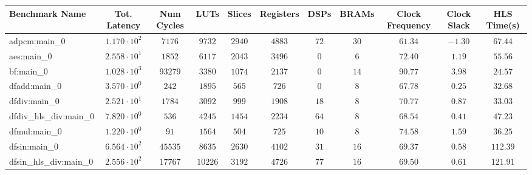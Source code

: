 \begin{tabular}{|l|c|c|c|c|c|c|c|c|c|c|}
\hline
Benchmark Name          & Tot. Latency           & Num Cycles & LUTs      & Slices    & Registers & DSPs    & BRAMs   & Clock Frequency & Clock Slack & HLS Time(s) \\
\hline
adpcm:main\_0           & $ 1.170 \cdot 10^{2} $ & $ 7176   $ & $ 9732  $ & $ 2940  $ & $ 4883  $ & $ 72  $ & $ 30  $ & $ 61.34       $ & $ -1.30   $ & $ 67.44   $ \\
aes:main\_0             & $ 2.558 \cdot 10^{1} $ & $ 1852   $ & $ 6117  $ & $ 2043  $ & $ 3496  $ & $ 0   $ & $ 6   $ & $ 72.40       $ & $ 1.19    $ & $ 55.56   $ \\
bf:main\_0              & $ 1.028 \cdot 10^{3} $ & $ 93279  $ & $ 3380  $ & $ 1074  $ & $ 2137  $ & $ 0   $ & $ 14  $ & $ 90.77       $ & $ 3.98    $ & $ 24.57   $ \\
dfadd:main\_0           & $ 3.570 \cdot 10^{0} $ & $ 242    $ & $ 1895  $ & $ 565   $ & $ 726   $ & $ 0   $ & $ 8   $ & $ 67.78       $ & $ 0.25    $ & $ 32.68   $ \\
dfdiv:main\_0           & $ 2.521 \cdot 10^{1} $ & $ 1784   $ & $ 3092  $ & $ 999   $ & $ 1908  $ & $ 18  $ & $ 8   $ & $ 70.77       $ & $ 0.87    $ & $ 33.03   $ \\
dfdiv\_hls\_div:main\_0 & $ 7.820 \cdot 10^{0} $ & $ 536    $ & $ 4245  $ & $ 1454  $ & $ 2234  $ & $ 64  $ & $ 8   $ & $ 68.54       $ & $ 0.41    $ & $ 47.23   $ \\
dfmul:main\_0           & $ 1.220 \cdot 10^{0} $ & $ 91     $ & $ 1564  $ & $ 504   $ & $ 725   $ & $ 10  $ & $ 8   $ & $ 74.58       $ & $ 1.59    $ & $ 36.25   $ \\
dfsin:main\_0           & $ 6.564 \cdot 10^{2} $ & $ 45535  $ & $ 8635  $ & $ 2630  $ & $ 4102  $ & $ 31  $ & $ 16  $ & $ 69.37       $ & $ 0.58    $ & $ 112.39  $ \\
dfsin\_hls\_div:main\_0 & $ 2.556 \cdot 10^{2} $ & $ 17767  $ & $ 10226 $ & $ 3192  $ & $ 4726  $ & $ 77  $ & $ 16  $ & $ 69.50       $ & $ 0.61    $ & $ 121.91  $ \\

\end{tabular}
